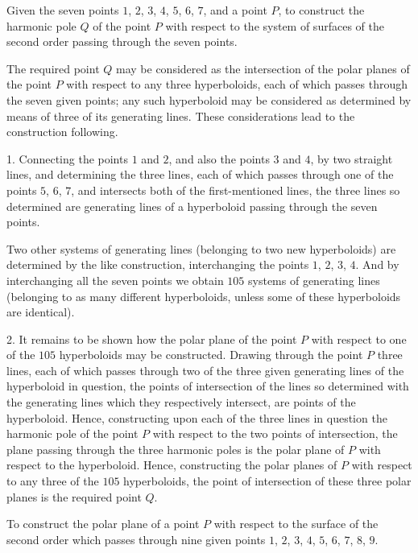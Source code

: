 \documentclass[11pt,a4paper]{book}
\begin{document}
\begin{problem}
Given the seven points $1$, $2$, $3$, $4$, $5$, $6$, $7$, and a point $P$, to construct the harmonic pole $Q$ of the point $P$ with respect to the system of surfaces of the second order passing through the seven points.
\end{problem}

The required point $Q$ may be considered as the intersection of the polar planes of the point $P$ with respect to any three hyperboloids, each of which passes through the seven given points; any such hyperboloid may be considered as determined by means of three of its generating lines. These considerations lead to the construction following.

1. Connecting the points $1$ and $2$, and also the points $3$ and $4$, by two straight lines, and determining the three lines, each of which passes through one of the points $5$, $6$, $7$, and intersects both of the first-mentioned lines, the three lines so determined are generating lines of a hyperboloid passing through the seven points.

Two other systems of generating lines (belonging to two new hyperboloids) are determined by the like construction, interchanging the points $1$, $2$, $3$, $4$. And by interchanging all the seven points we obtain $105$ systems of generating lines (belonging to as many different hyperboloids, unless some of these hyperboloids are identical).

2. It remains to be shown how the polar plane of the point $P$ with respect to one of the $105$ hyperboloids may be constructed. Drawing through the point $P$ three lines, each of which passes through two of the three given generating lines of the hyperboloid in question, the points of intersection of the lines so determined with the generating lines which they respectively intersect, are points of the hyperboloid. Hence, constructing upon each of the three lines in question the harmonic pole of the point $P$ with respect to the two points of intersection, the plane passing through the three harmonic poles is the polar plane of $P$ with respect to the hyperboloid. Hence, constructing the polar planes of $P$ with respect to any three of the $105$ hyperboloids, the point of intersection of these three polar planes is the required point $Q$.

\begin{problem}
To construct the polar plane of a point $P$ with respect to the surface of the second order which passes through nine given points $1$, $2$, $3$, $4$, $5$, $6$, $7$, $8$, $9$.
\end{problem}
\end{document}
